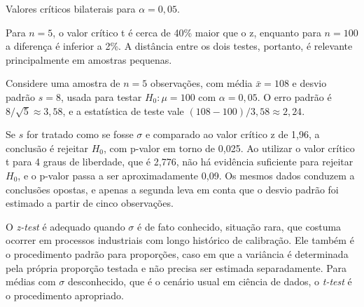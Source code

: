 {


\vspace{0.4em}
{\small Valores críticos bilaterais para $\alpha = 0{,}05$.}

\hspace*{1.5em}
Para $n = 5$, o valor crítico t é cerca de 40\% maior que o z,
enquanto para $n = 100$ a diferença é inferior a 2\%.
A distância entre os dois testes, portanto, é relevante principalmente em amostras pequenas.

\subtitle{Um exemplo numérico}

\hspace*{1.5em}
Considere uma amostra de $n = 5$ observações, com média $\bar{x} = 108$ e desvio padrão $s = 8$,
usada para testar $H_0: \mu = 100$ com $\alpha = 0{,}05$.
O erro padrão é $8/\sqrt{5} \approx 3{,}58$,
e a estatística de teste vale $(108 - 100)/3{,}58 \approx 2{,}24$.

\hspace*{1.5em}
Se $s$ for tratado como se fosse $\sigma$ e comparado ao valor crítico z de 1,96,
a conclusão é rejeitar $H_0$, com p-valor em torno de 0,025.
Ao utilizar o valor crítico t para 4 graus de liberdade, que é 2,776,
não há evidência suficiente para rejeitar $H_0$, e o p-valor passa a ser aproximadamente 0,09.
Os mesmos dados conduzem a conclusões opostas,
e apenas a segunda leva em conta que o desvio padrão foi estimado a partir de cinco observações.

\subtitle{Quando cada teste se aplica}

\hspace*{1.5em}
O \textit{z-test} é adequado quando $\sigma$ é de fato conhecido,
situação rara, que costuma ocorrer em processos industriais com longo histórico de calibração.
Ele também é o procedimento padrão para proporções,
caso em que a variância é determinada pela própria proporção testada
e não precisa ser estimada separadamente.
Para médias com $\sigma$ desconhecido, que é o cenário usual em ciência de dados,
o \textit{t-test} é o procedimento apropriado.

}
